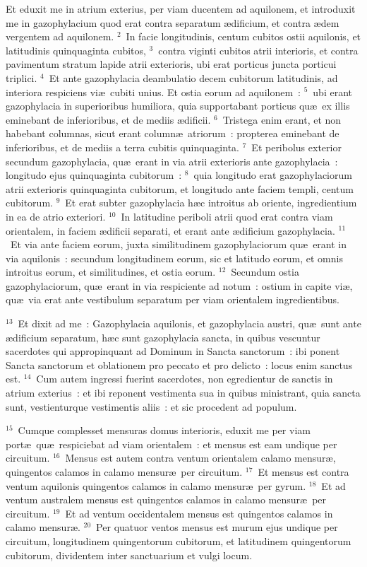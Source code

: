 \bchapter
\lettrine[lines=3,image=true,loversize=0.05,lraise=-0.03]{E}{}t eduxit me in atrium exterius, per viam ducentem ad aquilonem, et introduxit me in gazophylacium quod erat contra separatum \ae dificium, et contra \ae dem vergentem ad aquilonem.
${}^{2}$~In facie longitudinis, centum cubitos ostii aquilonis, et latitudinis quinquaginta cubitos,
${}^{3}$~contra viginti cubitos atrii interioris, et contra pavimentum stratum lapide atrii exterioris, ubi erat porticus juncta porticui triplici.
${}^{4}$~Et ante gazophylacia deambulatio decem cubitorum latitudinis, ad interiora respiciens vi\ae\ cubiti unius. Et ostia eorum ad aquilonem~:
${}^{5}$~ubi erant gazophylacia in superioribus humiliora, quia supportabant porticus qu\ae\ ex illis eminebant de inferioribus, et de mediis \ae dificii.
${}^{6}$~Tristega enim erant, et non habebant columnas, sicut erant column\ae\ atriorum~: propterea eminebant de inferioribus, et de mediis a terra cubitis quinquaginta.
${}^{7}$~Et peribolus exterior secundum gazophylacia, qu\ae\ erant in via atrii exterioris ante gazophylacia~: longitudo ejus quinquaginta cubitorum~:
${}^{8}$~quia longitudo erat gazophylaciorum atrii exterioris quinquaginta cubitorum, et longitudo ante faciem templi, centum cubitorum.
${}^{9}$~Et erat subter gazophylacia h\ae c introitus ab oriente, ingredientium in ea de atrio exteriori.
${}^{10}$~In latitudine periboli atrii quod erat contra viam orientalem, in faciem \ae dificii separati, et erant ante \ae dificium gazophylacia.
${}^{11}$~Et via ante faciem eorum, juxta similitudinem gazophylaciorum qu\ae\ erant in via aquilonis~: secundum longitudinem eorum, sic et latitudo eorum, et omnis introitus eorum, et similitudines, et ostia eorum.
${}^{12}$~Secundum ostia gazophylaciorum, qu\ae\ erant in via respiciente ad notum~: ostium in capite vi\ae , qu\ae\ via erat ante vestibulum separatum per viam orientalem ingredientibus.


${}^{13}$~Et dixit ad me~: Gazophylacia aquilonis, et gazophylacia austri, qu\ae\ sunt ante \ae dificium separatum, h\ae c sunt gazophylacia sancta, in quibus vescuntur sacerdotes qui appropinquant ad Dominum in Sancta sanctorum~: ibi ponent Sancta sanctorum et oblationem pro peccato et pro delicto~: locus enim sanctus est.
${}^{14}$~Cum autem ingressi fuerint sacerdotes, non egredientur de sanctis in atrium exterius~: et ibi reponent vestimenta sua in quibus ministrant, quia sancta sunt, vestienturque vestimentis aliis~: et sic procedent ad populum.


${}^{15}$~Cumque complesset mensuras domus interioris, eduxit me per viam port\ae\ qu\ae\ respiciebat ad viam orientalem~: et mensus est eam undique per circuitum.
${}^{16}$~Mensus est autem contra ventum orientalem calamo mensur\ae , quingentos calamos in calamo mensur\ae\ per circuitum.
${}^{17}$~Et mensus est contra ventum aquilonis quingentos calamos in calamo mensur\ae\ per gyrum.
${}^{18}$~Et ad ventum australem mensus est quingentos calamos in calamo mensur\ae\ per circuitum.
${}^{19}$~Et ad ventum occidentalem mensus est quingentos calamos in calamo mensur\ae .
${}^{20}$~Per quatuor ventos mensus est murum ejus undique per circuitum, longitudinem quingentorum cubitorum, et latitudinem quingentorum cubitorum, dividentem inter sanctuarium et vulgi locum.

